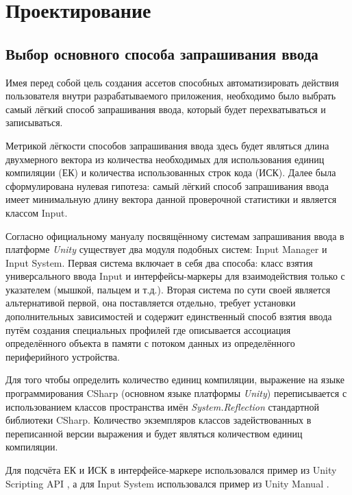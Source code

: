 \chapter{Проектирование}
\label{cha:ch_1}

\section{Выбор основного способа запрашивания ввода}
Имея перед собой цель создания ассетов способных автоматизировать действия пользователя внутри разрабатываемого приложения, необходимо было выбрать самый лёгкий способ запрашивания ввода, который будет перехватываться и записываться.

Метрикой лёгкости способов запрашивания ввода здесь будет являться длина двухмерного вектора из количества необходимых для использования единиц компиляции (ЕК) и количества использованных строк кода	 (ИСК). Далее была сформулирована нулевая гипотеза: самый лёгкий способ запрашивания ввода имеет минимальную длину вектора данной проверочной статистики и является классом Input.

Согласно официальному мануалу посвящённому системам запрашивания ввода \cite{unity_input_systems} в платформе \textit{Unity} существует два модуля подобных систем: Input Manager и Input System. Первая система включает в себя два способа: класс взятия универсального ввода Input и интерфейсы-маркеры для взаимодействия только с указателем (мышкой, пальцем и т.д.). Вторая система по сути своей является альтернативой первой, она поставляется отдельно, требует установки дополнительных зависимостей и содержит единственный способ взятия ввода путём создания специальных профилей где описывается ассоциация определённого объекта в памяти с потоком данных из определённого периферийного устройства.

Для того чтобы определить количество единиц компиляции, выражение на языке программирования CSharp (основном языке платформы \textit{Unity}) переписывается с использованием классов пространства имён \textit{System.Reflection} стандартной библиотеки CSharp. Количество экземпляров классов задействованных в переписанной версии выражения и будет являться количеством единиц компиляции.

Для подсчёта ЕК и ИСК в интерфейсе-маркере использовался пример из Unity Scripting API \cite{unity_interface}, а для Input System использовался пример из Unity Manual \cite{unity_is}.

